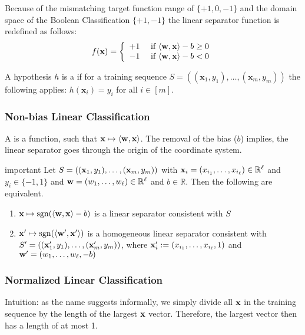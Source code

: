 Because of the mismatching target function range of $\{+1,0,-1\}$ and the domain space of the Boolean Classification $\{+1,-1\}$ the linear separator function is redefined as follows:
\begin{equation}
f(\mathbf{x})=\left\{\begin{array}{ll}{+1} & {\text { if } \langle\mathbf{w}, \mathbf{x}\rangle - b \geq 0} \\ {-1} & {\text { if }\langle\mathbf{w}, \mathbf{x}\rangle - b<0}\end{array}\right.
\end{equation}

A hypothesis $h$ is a  if for a training sequence $S = ((\mathbf{x}_{1}, y_{1}), \ldots,(\mathbf{x}_{m}, y_{m}))$ the following applies: $h(\mathbf{x}_i) = y_i$ for all $i \in [m]$.

\subsubsection{Non-bias Linear Classification}
A  is a function, such that $\mathbf{x} \mapsto \langle\mathbf{w},\mathbf{x}\rangle$. The removal of the bias ($b$) implies, the linear separator goes through the origin of the coordinate system.	
\begin{theorem}{important}
Let $S=((\mathbf{x}_{1}, y_{1}), \ldots,(\mathbf{x}_{m}, y_{m}))$ with $\mathbf{x}_{i}=(x_{i _1}, \ldots, x_{i_\ell}) \in \mathbb{R}^\ell$ and $y_{i} \in\{-1,1\}$ and $\mathbf{w}=(w_{1}, \ldots, w_\ell) \in \mathbb{R}^\ell$ and $b \in \mathbb{R}$. Then the following are equivalent.
\begin{enumerate}
	\item $\mathbf{x} \mapsto \operatorname{sgn}(\langle\mathbf{w}, \mathbf{x}\rangle- b)$ is a linear separator consistent with $S$
	\item $\mathbf{x}^{\prime} \mapsto \operatorname{sgn}(\langle\mathbf{w}^\prime, \mathbf{x}^\prime\rangle)$ is a homogeneous linear separator consistent with $S^\prime=((\mathbf{x}_1^\prime, y_1), \ldots,(\mathbf{x}_m^\prime, y_m))$,  where $\mathbf{x}_i^\prime :=(x_{i_1}, \ldots, x_{i_\ell}, 1) $ and $\mathbf{w}^\prime=(w_{1}, \ldots, w_\ell,-b)$
\end{enumerate}
\end{theorem}
\subsubsection{Normalized Linear Classification}
Intuition: as the name suggests informally, we simply divide all $\mathbf{x}$ in the training sequence by the length of the largest $\mathbf{x}$ vector. Therefore, the largest vector then has a length of at most 1.

